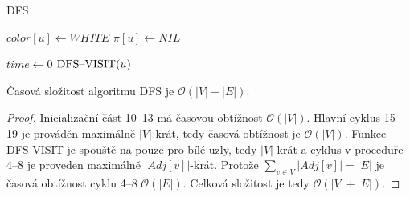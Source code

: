         \begin{algorithm}
            \DontPrintSemicolon
            \caption{DFS}
            \vspace*{0.5em}

            \vspace*{0.5em}

            {
                $color[u] \leftarrow WHITE$\;
                $\pi[u] \leftarrow NIL$\;
            }
            \vspace*{0.5em}

            $time \leftarrow 0$\;
            {
                {
                    $\textnormal{DFS--VISIT}(u)$\;
                }
            }
            \vspace*{0.5em}


        \end{algorithm}

        \vspace*{-1.5em}

        \begin{theorem}
            Časová složitost algoritmu DFS je $\mathcal{O}(|V| + |E|)$.
        \end{theorem}

        \begin{proof}
            Inicializační část 10--13 má časovou obtížnost $\mathcal{O}(|V|)$. Hlavní cyklus 15--19 je prováděn maximálně $|V|$-krát, tedy časová obtížnost je $\mathcal{O}(|V|)$. Funkce DFS-VISIT je spouště na pouze pro bílé uzly, tedy $|V|$-krát a cyklus v proceduře 4--8 je proveden maximálně $|Adj[v]|$-krát. Protože $\sum_{v \in V}|Adj[v]| = |E|$ je časová obtížnost cyklu 4--8 $\mathcal{O}(|E|)$. Celková složitost je tedy $\mathcal{O}(|V| + |E|)$.
        \end{proof}


